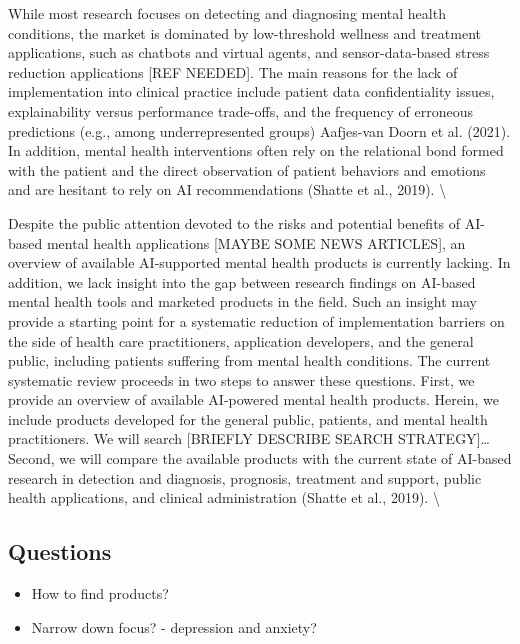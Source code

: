 \documentclass[
  man]{apa7}
\providecommand{\tightlist}{%
  \setlength{\itemsep}{0pt}\setlength{\parskip}{0pt}}
\begin{document}
While most research focuses on detecting and diagnosing mental health conditions, the market is dominated by low-threshold wellness and treatment applications, such as chatbots and virtual agents, and sensor-data-based stress reduction applications {[}REF NEEDED{]}.
The main reasons for the lack of implementation into clinical practice include patient data confidentiality issues, explainability versus performance trade-offs, and the frequency of erroneous predictions (e.g., among underrepresented groups) Aafjes-van Doorn et al. (2021).
In addition, mental health interventions often rely on the relational bond formed with the patient and the direct observation of patient behaviors and emotions and are hesitant to rely on AI recommendations (Shatte et al., 2019). \textbackslash{}

Despite the public attention devoted to the risks and potential benefits of AI-based mental health applications {[}MAYBE SOME NEWS ARTICLES{]}, an overview of available AI-supported mental health products is currently lacking.
In addition, we lack insight into the gap between research findings on AI-based mental health tools and marketed products in the field.
Such an insight may provide a starting point for a systematic reduction of implementation barriers on the side of health care practitioners, application developers, and the general public, including patients suffering from mental health conditions.
The current systematic review proceeds in two steps to answer these questions.
First, we provide an overview of available AI-powered mental health products.
Herein, we include products developed for the general public, patients, and mental health practitioners.
We will search {[}BRIEFLY DESCRIBE SEARCH STRATEGY{]}\ldots{}
Second, we will compare the available products with the current state of AI-based research in detection and diagnosis, prognosis, treatment and support, public health applications, and clinical administration (Shatte et al., 2019). \textbackslash{}

\hypertarget{questions}{%
\subsection{Questions}\label{questions}}

\begin{itemize}
\tightlist
\item
  How to find products?
\item
  Narrow down focus? - depression and anxiety?
\end{itemize}
\end{document}
